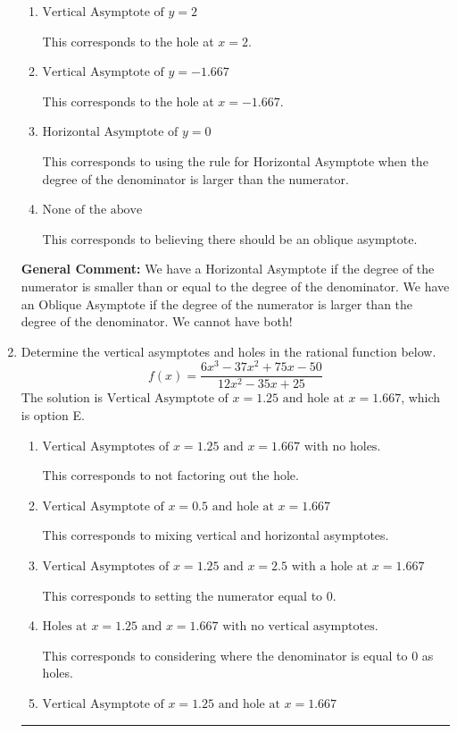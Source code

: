 \documentclass{extbook}[14pt]
\newcommand{\litem}[1]{\item #1

\rule{\textwidth}{0.4pt}}
\begin{document}
\begin{enumerate}
{\begin{enumerate}[label=\Alph*.]
* This is the correct option.
\item \( \text{Vertical Asymptote of } y = 2  \)

This corresponds to the hole at $x = 2$.
\item \( \text{Vertical Asymptote of } y = -1.667  \)

This corresponds to the hole at $x = -1.667$.
\item \( \text{Horizontal Asymptote of } y = 0  \)

This corresponds to using the rule for Horizontal Asymptote when the degree of the denominator is larger than the numerator.
\item \( \text{None of the above} \)

This corresponds to believing there should be an oblique asymptote.
\end{enumerate}

\textbf{General Comment:} We have a Horizontal Asymptote if the degree of the numerator is smaller than or equal to the degree of the denominator. We have an Oblique Asymptote if the degree of the numerator is larger than the degree of the denominator. We cannot have both!
}
\litem{
Determine the vertical asymptotes and holes in the rational function below.
\[ f(x) = \frac{6x^{3} -37 x^{2} +75 x -50}{12x^{2} -35 x + 25} \]The solution is \( \text{Vertical Asymptote of } x = 1.25 \text{ and hole at } x = 1.667 \), which is option E.\begin{enumerate}[label=\Alph*.]
\item \( \text{Vertical Asymptotes of } x = 1.25 \text{ and } x = 1.667 \text{ with no holes.} \)

This corresponds to not factoring out the hole.
\item \( \text{Vertical Asymptote of } x = 0.5 \text{ and hole at } x = 1.667 \)

This corresponds to mixing vertical and horizontal asymptotes.
\item \( \text{Vertical Asymptotes of } x = 1.25 \text{ and } x = 2.5 \text{ with a hole at } x = 1.667 \)

This corresponds to setting the numerator equal to 0.
\item \( \text{Holes at } x = 1.25 \text{ and } x = 1.667 \text{ with no vertical asymptotes.} \)

This corresponds to considering where the denominator is equal to 0 as holes.
\item \( \text{Vertical Asymptote of } x = 1.25 \text{ and hole at } x = 1.667 \)


\end{enumerate}}
\end{enumerate}
\end{document}
